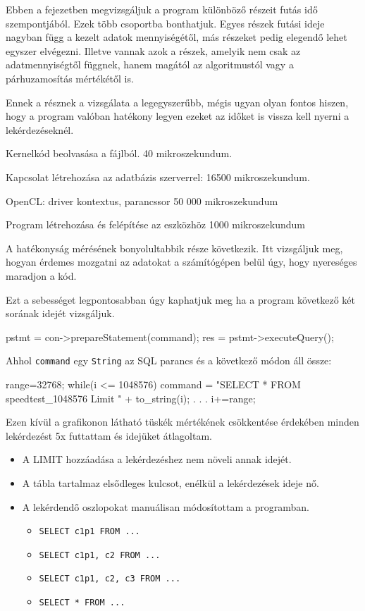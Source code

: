 
Ebben a fejezetben megvizsgáljuk a program különböző részeit futás idő szempontjából. Ezek több csoportba bonthatjuk. Egyes részek futási ideje nagyban függ a kezelt adatok mennyiségétől, más részeket pedig elegendő lehet egyszer elvégezni. Illetve vannak azok a részek, amelyik nem csak az adatmennyiségtől függnek, hanem magától az algoritmustól vagy a párhuzamosítás mértékétől is.

Ennek a résznek a vizsgálata a legegyszerűbb, mégis ugyan olyan fontos hiszen, hogy a program valóban hatékony legyen ezeket az időket is vissza kell nyerni a lekérdezéseknél.

Kernelkód beolvasása a fájlból.
40 mikroszekundum.

Kapcsolat létrehozása az adatbázis szerverrel:
16500 mikroszekundum.

OpenCL: driver kontextus, parancssor
50 000 mikroszekundum

Program létrehozása és felépítése az eszközhöz
1000 mikroszekundum


A hatékonyság mérésének bonyolultabbik része következik. Itt vizsgáljuk meg, hogyan érdemes mozgatni az adatokat a számítógépen belül úgy, hogy nyereséges maradjon a kód.

Ezt a sebességet legpontosabban úgy kaphatjuk meg ha a program következő két sorának idejét vizsgáljuk.
\begin{python}
pstmt = con->prepareStatement(command);
res = pstmt->executeQuery();
\end{python}
Ahhol \texttt{command} egy \texttt{String} az SQL parancs és a következő módon áll össze:
\begin{python}
range=32768;
    while(i <= 1048576){
    		command = "SELECT * FROM speedtest_1048576 Limit " 
    			+ to_string(i);
    		. . .
   	 	i+=range;
    }
\end{python}
Ezen kívül a grafikonon látható tüskék mértékének csökkentése érdekében minden lekérdezést 5x futtattam és idejüket átlagoltam.
\begin{itemize}
\item A LIMIT hozzáadása a lekérdezéshez nem növeli annak idejét.
\item A tábla tartalmaz elsődleges kulcsot, enélkül a lekérdezések ideje nő.
\item A lekérdendő oszlopokat manuálisan módosítottam a programban. 
\begin{itemize} 
\item \texttt{SELECT c1p1 FROM ...}
\item \texttt{SELECT c1p1, c2 FROM ...} 
\item \texttt{SELECT c1p1, c2, c3 FROM ...} 
\item \texttt{SELECT * FROM ...} 
\end{itemize}
\end{itemize}

